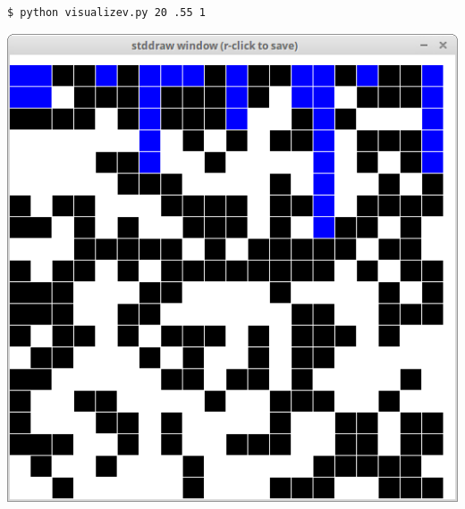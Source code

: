 \documentclass[8pt,a4paper,compress,handout]{beamer}
\begin{document}
\begin{frame}[fragile]
\begin{minipage}{160pt}
\begin{lstlisting}[language={}]
$ python visualizev.py 20 .55 1
\end{lstlisting}
\end{minipage}%
\begin{minipage}{140pt}
\hfill \includegraphics[scale=0.15]{figures/percolation6.png}
\end{minipage}
\end{frame}
\end{document}
